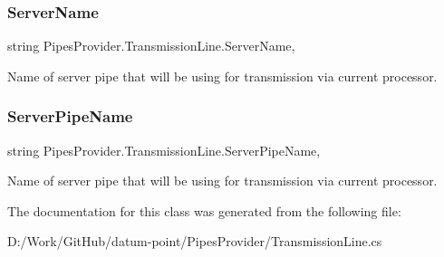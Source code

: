 \subsubsection{\texorpdfstring{Server\+Name}{ServerName}}
{\footnotesize\ttfamily string Pipes\+Provider.\+Transmission\+Line.\+Server\+Name\hspace{0.3cm}{\ttfamily [get]}, {}}



Name of server pipe that will be using for transmission via current processor. 

\mbox{\label{class_pipes_provider_1_1_transmission_line_a6acb67e0969ca43a54c9895ab1cdaae8}} 
\subsubsection{\texorpdfstring{Server\+Pipe\+Name}{ServerPipeName}}
{\footnotesize\ttfamily string Pipes\+Provider.\+Transmission\+Line.\+Server\+Pipe\+Name\hspace{0.3cm}{\ttfamily [get]}, {}}



Name of server pipe that will be using for transmission via current processor. 



The documentation for this class was generated from the following file\+:\begin{DoxyCompactItemize}
\item 
D\+:/\+Work/\+Git\+Hub/datum-\/point/\+Pipes\+Provider/Transmission\+Line.\+cs\end{DoxyCompactItemize}
